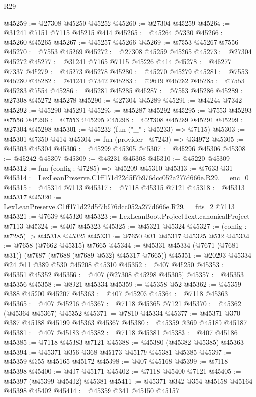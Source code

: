 \begin{lexlean}{R29}
\begin{coremodule}
@45259 := @27308 @45250 @45252
@45260 := @27304 @45259
@45264 := @31241 @7151 @7115 @45215 @414
@45265 := @45264 @7330
@45266 := @45260 @45265
@45267 := @45257 @45266
@45269 := @7553 @45267 @7556
@45270 := @7553 @45269
@45272 := @27308 @45259 @45265
@45273 := @27304 @45272
@45277 := @31241 @7165 @7115 @45226 @414
@45278 := @45277 @7337
@45279 := @45273 @45278
@45280 := @45270 @45279
@45281 := @7553 @45280
@45282 := @44241 @7342
@45283 := @9619 @45282
@45285 := @7553 @45283 @7554
@45286 := @45281 @45285
@45287 := @7553 @45286
@45289 := @27308 @45272 @45278
@45290 := @27304 @45289
@45291 := @44244 @7342
@45292 := @45290 @45291
@45293 := @45287 @45292
@45295 := @7553 @45293 @7556
@45296 := @7553 @45295
@45298 := @27308 @45289 @45291
@45299 := @27304 @45298
@45301 := @45232 (fun ("_" : @45233) => @7115)
@45303 := @45301 @7350 @414
@45304 := fun (provider : @7243) => @34972
@45305 := @45303 @45304
@45306 := @45299 @45305
@45307 := @45296 @45306
@45308 := @45242 @45307
@45309 := @45231 @45308
@45310 := @45220 @45309
@45312 := fun (config : @7285) => @45209 @45310
@45313 := @7633 @31
@45314 := LexLeanPreserve.C1ff171d22d5f7b976dcc052a277d666e.R29.__enc_0
@45315 := @45314 @7113
@45317 := @7118 @45315 @7121
@45318 := @45313 @45317
@45320 := LexLeanPreserve.C1ff171d22d5f7b976dcc052a277d666e.R29.__fits_2 @7113
@45321 := @7639 @45320
@45323 := LexLeanBoot.ProjectText.canonicalProject @7113
@45324 := @407 @45323
@45325 := @45321 @45324
@45327 := (config : @7285) -> @45318 @45325
@45331 := @7650 @31 @45317 @45325 @532
@45334 := @7658 (@7662 @45315) @7665
@45344 := @45331 @45334 (@7671 (@7681 @31)) (@7687 (@7688 (@7689 @532) @45317 @7665))
@45351 := @20293 @45334 @24 @11 @389 @530 @45208 @45310
@45352 := @407 @45250
@45353 := @45351 @45352
@45356 := @407 (@27308 @45298 @45305)
@45357 := @45353 @45356
@45358 := @8921 @45334
@45359 := @45358 @52
@45362 := @45359 @388 @45200 @45207
@45363 := @407 @45203
@45364 := @7118 @45363
@45365 := @407 @45206
@45367 := @7118 @45365 @7121
@45370 := @45362 (@45364 @45367) @45352
@45371 := @7810 @45334
@45377 := @45371 @370 @387 @45188 @45199 @45363 @45367
@45380 := @45359 @369 @45180 @45187
@45381 := @407 @45183
@45382 := @7118 @45381
@45383 := @407 @45186
@45385 := @7118 @45383 @7121
@45388 := @45380 (@45382 @45385) @45363
@45394 := @45371 @356 @368 @45173 @45179 @45381 @45385
@45397 := @45359 @355 @45165 @45172
@45398 := @407 @45168
@45399 := @7118 @45398
@45400 := @407 @45171
@45402 := @7118 @45400 @7121
@45405 := @45397 (@45399 @45402) @45381
@45411 := @45371 @342 @354 @45158 @45164 @45398 @45402
@45414 := @45359 @341 @45150 @45157

\end{coremodule}
\end{lexlean}
